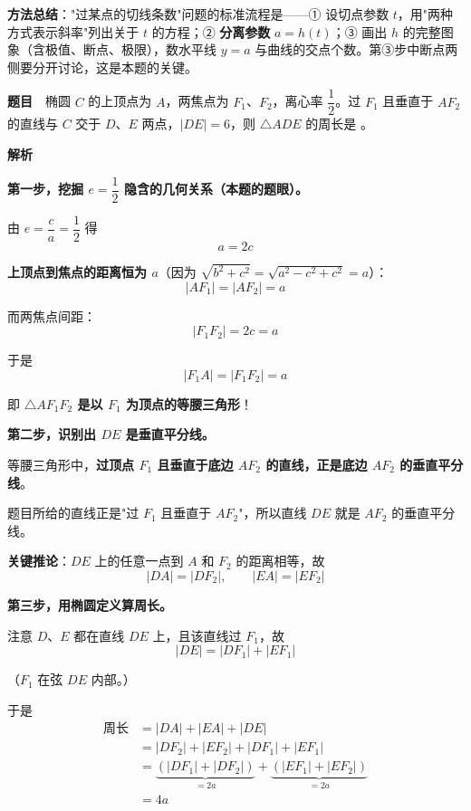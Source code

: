 
\begin{gktip}
\textbf{方法总结}："过某点的切线条数"问题的标准流程是——① 设切点参数 $t$，用"两种方式表示斜率"列出关于 $t$ 的方程；② \textbf{分离参数} $a=h(t)$；③ 画出 $h$ 的完整图象（含极值、断点、极限），数水平线 $y=a$ 与曲线的交点个数。第③步中断点两侧要分开讨论，这是本题的关键。
\end{gktip}

\par\medskip


\textbf{题目}　椭圆 $C$ 的上顶点为 $A$，两焦点为 $F_1$、$F_2$，离心率 $\dfrac12$。过 $F_1$ 且垂直于 $AF_2$ 的直线与 $C$ 交于 $D$、$E$ 两点，$|DE|=6$，则 $\triangle ADE$ 的周长是 \gkblank{}。

\textbf{解析}

\textbf{第一步，挖掘 $e=\dfrac12$ 隐含的几何关系（本题的题眼）。}

由 $e=\dfrac ca=\dfrac12$ 得
\[a=2c\]

\textbf{上顶点到焦点的距离恒为 $a$}（因为 $\sqrt{b^{2}+c^{2}}=\sqrt{a^{2}-c^{2}+c^{2}}=a$）：
\[\left|AF_1\right|=\left|AF_2\right|=a\]

而两焦点间距：
\[\left|F_1F_2\right|=2c=a\]

于是
\[\left|F_1A\right|=\left|F_1F_2\right|=a\]

即 \textbf{$\triangle AF_1F_2$ 是以 $F_1$ 为顶点的等腰三角形}！

\textbf{第二步，识别出 $DE$ 是垂直平分线。}

等腰三角形中，\textbf{过顶点 $F_1$ 且垂直于底边 $AF_2$ 的直线，正是底边 $AF_2$ 的垂直平分线}。

题目所给的直线正是"过 $F_1$ 且垂直于 $AF_2$"，所以直线 $DE$ 就是 $AF_2$ 的垂直平分线。

\textbf{关键推论}：$DE$ 上的任意一点到 $A$ 和 $F_2$ 的距离相等，故
\[|DA|=\left|DF_2\right|,\qquad |EA|=\left|EF_2\right|\]

\textbf{第三步，用椭圆定义算周长。}

注意 $D$、$E$ 都在直线 $DE$ 上，且该直线过 $F_1$，故
\[|DE|=\left|DF_1\right|+\left|EF_1\right|\]

（$F_1$ 在弦 $DE$ 内部。）

于是
\[\begin{aligned}
\text{周长}&=|DA|+|EA|+|DE|\\
&=\left|DF_2\right|+\left|EF_2\right|+\left|DF_1\right|+\left|EF_1\right|\\
&=\underbrace{\left(\left|DF_1\right|+\left|DF_2\right|\right)}_{=2a}+\underbrace{\left(\left|EF_1\right|+\left|EF_2\right|\right)}_{=2a}\\
&=4a
\end{aligned}\]

